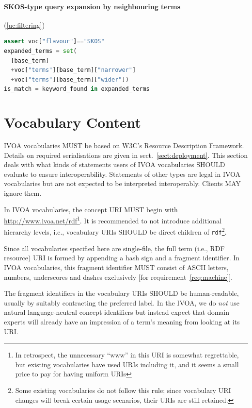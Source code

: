 \documentclass[11pt,a4paper]{ivoa}
\begin{document}
\paragraph{SKOS-type query expansion by neighbouring terms}
(\ref{uc:filtering})
\begin{lstlisting}[language=python]
assert voc["flavour"]=="SKOS"
expanded_terms = set(
  [base_term]
  +voc["terms"][base_term]["narrower"]
  +voc["terms"][base_term]["wider"])
is_match = keyword_found in expanded_terms
\end{lstlisting}


\section{Vocabulary Content}
\label{sect:voccontent}

IVOA vocabularies MUST be based on W3C's Resource Description Framework.
Details on required serialisations are given in
sect.~\ref{sect:deployment}.  This section deals with what kinds of
statements users of IVOA vocabularies SHOULD evaluate to ensure
interoperability.   Statements of other types are legal in IVOA
vocabularies but are not expected to be interpreted interoperably.
Clients MAY ignore them.

In IVOA vocabularies, the concept URI MUST begin with
\url{http://www.ivoa.net/rdf}\footnote{In retrospect, the unnecessary
``www'' in this URI is somewhat regrettable, but existing vocabularies
have used URIs including it, and it seems a small price to pay for
having uniform URIs}.  It is recommended to not introduce
additional hierarchy levels, i.e., vocabulary URIs SHOULD be direct children
of \texttt{rdf}\footnote{Some existing vocabularies do not follow this
rule; since vocabulary URI changes will break certain usage scenarios,
their URIs are still retained.}.

Since all vocabularies specified here are
single-file, the full term (i.e., RDF resource) 
URI is formed by appending a hash sign
and a fragment identifier.  In IVOA vocabularies, this fragment
identifier MUST consist of ASCII letters, numbers, underscores and
dashes exclusively [for requirement~\ref{req:machine}].

The fragment identifiers in the vocabulary URIs SHOULD be
human-readable, usually by suitably contracting the
preferred label.  In the IVOA, we do \emph{not} use natural
language-neutral concept identifiers but instead expect that domain
experts will already have an impression of a term's meaning from looking
at its URI.
\end{document}
